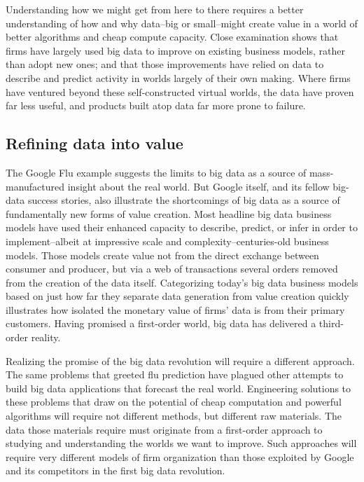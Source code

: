 \documentclass[12pt]{article}
\begin{document}
Understanding how we might get from here to there requires a better
understanding of how and why data--big or small--might create value in
a world of better algorithms and cheap compute capacity. Close
examination shows that firms have largely used big data to improve on
existing business models, rather than adopt new ones; and that those
improvements have relied on data to describe and predict activity in
worlds largely of their own making. Where firms have ventured beyond
these self-constructed virtual worlds, the data have proven far less
useful, and products built atop data far more prone to failure. 


\subsection{Refining data into value}
\label{sec:locating-value-data}


The Google Flu example suggests the limits to big data as a source of
mass-manufactured insight about the real world. But Google itself, and
its fellow big-data success stories, also illustrate the shortcomings
of big data as a source of fundamentally new forms of value creation. Most
headline big data business models have used their enhanced capacity to
describe, predict, or infer in order to implement--albeit at
impressive scale and complexity--centuries-old business models. Those
models create value not from the direct exchange between consumer and
producer, but via a web of transactions several orders removed from
the creation of the data itself. Categorizing today's big data
business models based on just how far they separate data generation
from value creation quickly illustrates how isolated the monetary
value of firms' data is from their primary customers. Having promised
a first-order world, big data has delivered a third-order
reality. 

Realizing the promise of the big data revolution will require
a different approach. The same problems that greeted flu prediction
have plagued other attempts to build big data applications that
forecast the real world. Engineering solutions to these problems that
draw on the potential of cheap computation and powerful algorithms
will require not different methods, but different raw materials. The
data those materials require must originate from a first-order
approach to studying and understanding the worlds we want to
improve. Such approaches will require very different models of firm
organization than those exploited by Google and its competitors in the
first big data revolution.
\end{document}
